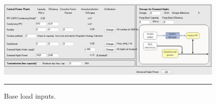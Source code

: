 \begin{figure}[htbp]
	\centering
	\includegraphics[width=\textwidth]{figures/B02_base_load.png}
	\rule{\textwidth}{0.5pt} %
	\caption{Base load inputs.}
	\label{fig:B02_base_load}
\end{figure}